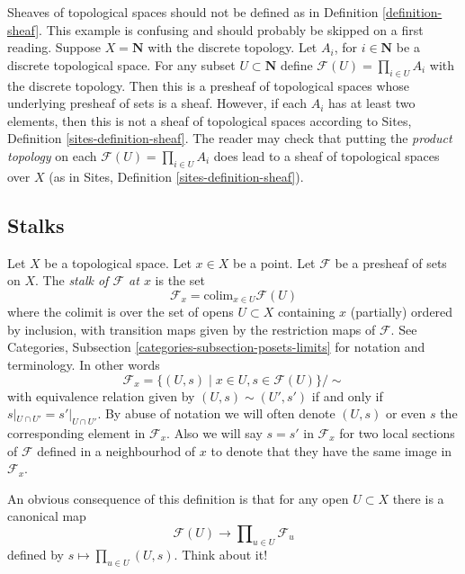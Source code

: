 \begin{example}
\label{example-sheaves-topological-spaces}
Sheaves of topological spaces should not be defined as
in Definition \ref{definition-sheaf}.
This example is confusing and should probably be skipped on
a first reading. Suppose $X = \mathbf{N}$ with the discrete
topology. Let $A_i$, for $i \in \mathbf{N}$ be a discrete
topological space. For any subset $U \subset \mathbf{N}$
define $\mathcal{F}(U) = \prod_{i\in U} A_i$ with the
discrete topology. Then this is a presheaf of topological
spaces whose underlying presheaf of sets is a sheaf.
However, if each $A_i$ has at least two elements, then
this is not a sheaf of topological spaces
according to Sites, Definition \ref{sites-definition-sheaf}.
The reader may check that putting the {\it product topology} on
each $\mathcal{F}(U) = \prod_{i\in U} A_i$ does lead to a sheaf
of topological spaces over $X$ (as in Sites,
Definition \ref{sites-definition-sheaf}).
\end{example}






\subsection{Stalks}
\label{subsection-stalks}

\noindent
Let $X$ be a topological space. Let $x \in X$ be a point.
Let $\mathcal{F}$ be a presheaf of sets on $X$.
The {\it stalk of $\mathcal{F}$ at $x$} is the set
$$
\mathcal{F}_x
=
\text{colim}_{x\in U} \mathcal{F}(U)
$$
where the colimit is over the set of opens $U \subset X$
containing $x$ (partially) ordered by inclusion, with
transition maps given by the restriction maps of $\mathcal{F}$.
See Categories, Subsection \ref{categories-subsection-posets-limits}
for notation and terminology. In other words
$$
\mathcal{F}_x
=
\{
(U,s)
\mid
x\in U, s\in \mathcal{F}(U)
\}/\sim
$$
with equivalence relation given by $(U,s) \sim (U', s')$
if and only if $s|_{U\cap U'} = s'|_{U\cap U'}$. By abuse of
notation we will often denote $(U, s)$
or even $s$ the corresponding element in $\mathcal{F}_x$.
Also we will say $s = s'$ in $\mathcal{F}_x$ for two local sections
of $\mathcal{F}$ defined in a neighbourhod of $x$ to denote that
they have the same image in $\mathcal{F}_x$.

\medskip\noindent
An obvious consequence of this definition is that
for any open $U \subset X$ there is a canonical map
$$
\mathcal{F}(U) 
\longrightarrow
\prod\nolimits_{u \in U} \mathcal{F}_u
$$
defined by $s \mapsto \prod_{u \in U} (U, s)$. Think about it!

